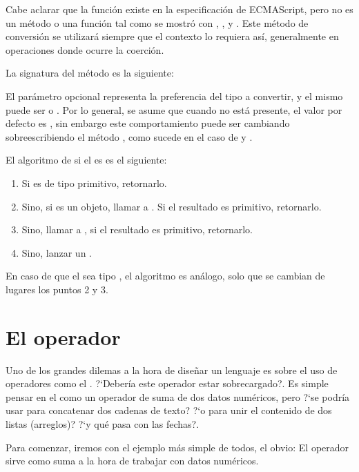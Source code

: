 Cabe aclarar que la función  existe en la especificación de ECMAScript, pero no es un método o una función tal como se mostró con , ,  y . Este método de conversión se utilizará siempre que el contexto lo requiera así, generalmente en operaciones donde ocurre la coerción.

La signatura del método es la siguiente: 

El parámetro opcional  representa la preferencia del tipo a convertir, y el mismo puede ser  o . Por lo general, se asume que cuando no está presente, el valor por defecto es , sin embargo este comportamiento puede ser cambiando sobreescribiendo el método , como sucede en el caso de  y .

El algoritmo de  si el  es  es el siguiente:

\begin{enumerate}
\item Si  es de tipo primitivo, retornarlo.
\item Sino, si  es un objeto, llamar a . Si el resultado es primitivo, retornarlo.
\item Sino, llamar a , si el resultado es primitivo, retornarlo.
\item Sino, lanzar un .
\end{enumerate}

En caso de que el  sea tipo , el algoritmo es análogo, solo que se cambian de lugares los puntos 2 y 3.

\section{El operador \code{+}}
\label{sec:operadormas}

Uno de los grandes dilemas a la hora de diseñar un lenguaje es sobre el uso de operadores como el \code{+}. ?`Debería este operador estar sobrecargado?. Es simple pensar en el \code{+} como un operador de suma de dos datos numéricos, pero ?`se podría usar para concatenar dos cadenas de texto? ?`o para unir el contenido de dos listas (arreglos)? ?`y qué pasa con las fechas?. 

Para comenzar, iremos con el ejemplo más simple de todos, el obvio: El operador \code{+} sirve como suma a la hora de trabajar con datos numéricos.

